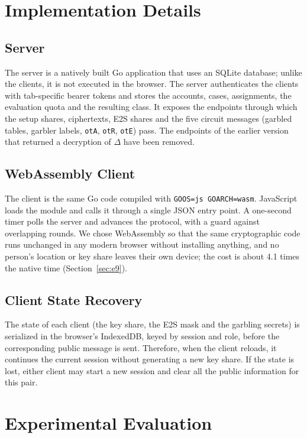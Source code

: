\documentclass[conference,letterpaper]{IEEEtran}
\newcommand{\code}[1]{\texttt{\footnotesize #1}}
\begin{document}
\section{Implementation Details}\label{sec:impl}
\subsection{Server}
The server is a natively built Go application that uses an SQLite database; unlike the clients, it is not executed in the browser. The server authenticates the clients with tab-specific bearer tokens and stores the accounts, cases, assignments, the evaluation quota and the resulting class. It exposes the endpoints through which the setup shares, ciphertexts, E2S shares and the five circuit messages (garbled tables, garbler labels, \code{otA}, \code{otR}, \code{otE}) pass. The endpoints of the earlier version that returned a decryption of $\Delta$ have been removed.

\subsection{WebAssembly Client}
The client is the same Go code compiled with \code{GOOS=js GOARCH=wasm}. JavaScript loads the module and calls it through a single JSON entry point. A one-second timer polls the server and advances the protocol, with a guard against overlapping rounds. We chose WebAssembly so that the same cryptographic code runs unchanged in any modern browser without installing anything, and no person's location or key share leaves their own device; the cost is about 4.1 times the native time (Section~\ref{sec:e9}).

\subsection{Client State Recovery}
The state of each client (the key share, the E2S mask and the garbling secrets) is serialized in the browser's IndexedDB, keyed by session and role, before the corresponding public message is sent. Therefore, when the client reloads, it continues the current session without generating a new key share. If the state is lost, either client may start a new session and clear all the public information for this pair.

\section{Experimental Evaluation}\label{sec:eval}
\end{document}
